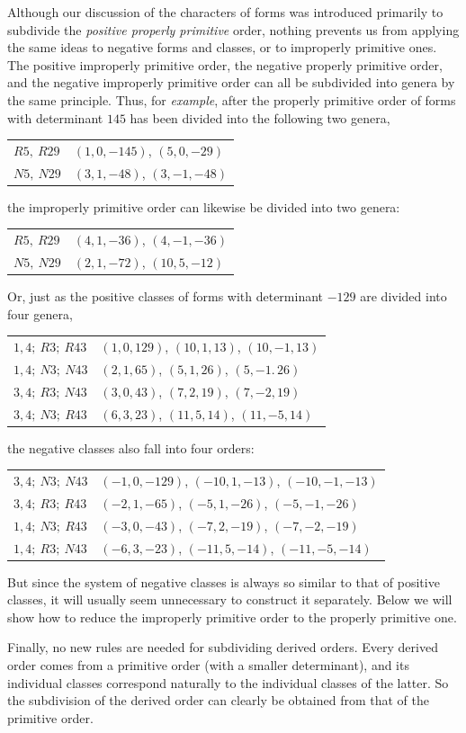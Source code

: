 Although our discussion of the characters of forms was introduced primarily to subdivide the \textit{positive properly primitive} order, nothing prevents us from applying the same ideas to negative forms and classes, or to improperly primitive ones. The positive improperly primitive order, the negative properly primitive order, and the negative improperly primitive order can all be subdivided into genera by the same principle. Thus, for \textit{example}, after the properly primitive order of forms with determinant $145$ has been divided into the following two genera,
\begin{center}
\begin{tabular}{l|l}
$R5,\ R29$ & $(1,0,-145)$, $(5,0,-29)$ \\
$N5,\ N29$ & $(3,1,-48)$, $(3,-1,-48)$
\end{tabular}
\end{center}
the improperly primitive order can likewise be divided into two genera:
\begin{center}
\begin{tabular}{l|l}
$R5,\ R29$ & $(4,1,-36)$, $(4,-1,-36)$ \\
$N5,\ N29$ & $(2,1,-72)$, $(10,5,-12)$
\end{tabular}
\end{center}
Or, just as the positive classes of forms with determinant $-129$ are divided into four genera,
\begin{center}
\begin{tabular}{l|l}
$1,4;\ R3;\ R43$ & $(1,0,129)$, $(10,1,13)$, $(10,-1,13)$ \\
$1,4;\ N3;\ N43$ & $(2,1,65)$, $(5,1,26)$, $(5,-1.\,26)$ \\
$3,4;\ R3;\ N43$ & $(3,0,43)$, $(7,2,19)$, $(7,-2,19)$ \\
$3,4;\ N3;\ R43$ & $(6,3,23)$, $(11,5,14)$, $(11,-5,14)$
\end{tabular}
\end{center}
the negative classes also fall into four orders:
\begin{center}
\begin{tabular}{l|l}
$3,4;\ N3;\ N43$ & $(-1,0,-129)$, $(-10,1,-13)$, $(-10,-1,-13)$ \\
$3,4;\ R3;\ R43$ & $(-2,1,-65)$, $(-5,1,-26)$, $(-5,-1,-26)$ \\
$1,4;\ N3;\ R43$ & $(-3,0,-43)$, $(-7,2,-19)$, $(-7,-2,-19)$ \\
$1,4;\ R3;\ N43$ & $(-6,3,-23)$, $(-11,5,-14)$, $(-11,-5,-14)$
\end{tabular}
\end{center}
But since the system of negative classes is always so similar to that of positive classes, it will usually seem unnecessary to construct it separately. Below we will show how to reduce the improperly primitive order to the properly primitive one.

Finally, no new rules are needed for subdividing derived orders. Every derived order comes from a primitive order (with a smaller determinant), and its individual classes correspond naturally to the individual classes of the latter. So the subdivision of the derived order can clearly be obtained from that of the primitive order.
